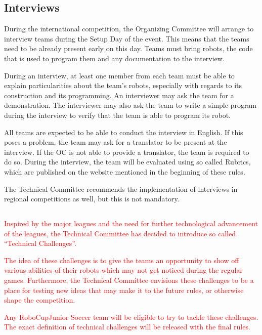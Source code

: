 \documentclass{article}
\begin{document}
\subsection{Interviews \label{ref-060}}

During the international competition, the Organizing Committee will arrange to
interview teams during the Setup Day of the event. This means that the teams
need to be already present early on this day. Teams must bring robots, the code
that is used to program them and any documentation to the interview.

During an interview, at least one member from each team must be able to explain
particularities about the team's robots, especially with regards to its
construction and its programming. An interviewer may ask the team for a
demonstration. The interviewer may also ask the team to write a simple program
during the interview to verify that the team is able to program its robot.

All teams are expected to be able to conduct the interview in English. If this
poses a problem, the team may ask for a translator to be present at the
interview. If the OC is not able to provide a translator, the team is required
to do so. During the interview, the team will be evaluated using so called
Rubrics, which are published on the website mentioned in the beginning of these
rules.

The Technical Committee recommends the implementation of interviews in regional
competitions as well, but this is not mandatory.

\subsection{}

\textcolor{red}{Inspired by the major leagues and the need for further technological
advancement of the leagues, the Technical Committee has decided to introduce so
called ``Technical Challenges''.}

\textcolor{red}{The idea of these challenges is to give the teams an opportunity to show off
various abilities of their robots which may not get noticed during the regular
games. Furthermore, the Technical Committee envisions these challenges to be a
place for testing new ideas that may make it to the future rules, or otherwise
shape the competition.}

\textcolor{red}{Any RoboCupJunior Soccer team will be eligible to try to tackle these
challenges. The exact definition of technical challenges will be released with
the final rules.}
\end{document}
